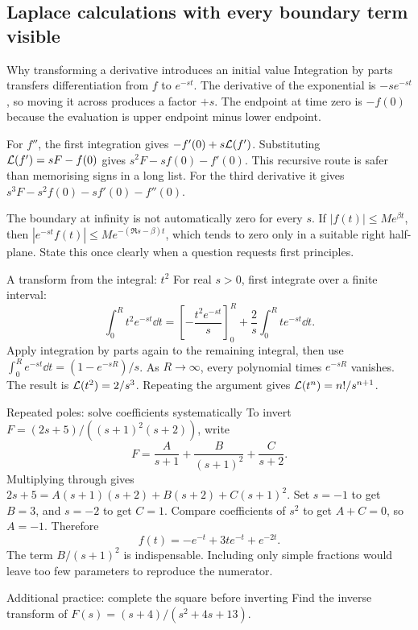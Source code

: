 \subsection{Laplace calculations with every boundary term visible}
\begin{concept}{Why transforming a derivative introduces an initial value}
Integration by parts transfers differentiation from $f$ to $e^{-st}$. The derivative of the exponential is $-se^{-st}$, so moving it across produces a factor $+s$. The endpoint at time zero is $-f(0)$ because the evaluation is upper endpoint minus lower endpoint.

For $f''$, the first integration gives $-f'(0)+s\mathcal L(f')$. Substituting $\mathcal L(f')=sF-f(0)$ gives $s^2F-sf(0)-f'(0)$. This recursive route is safer than memorising signs in a long list. For the third derivative it gives $s^3F-s^2f(0)-sf'(0)-f''(0)$.

The boundary at infinity is not automatically zero for every $s$. If $|f(t)|\leq Me^{\beta t}$, then $|e^{-st}f(t)|\leq Me^{-(\Re s-\beta)t}$, which tends to zero only in a suitable right half-plane. State this once clearly when a question requests first principles.
\end{concept}
\begin{worked}{A transform from the integral: $t^2$}
For real $s>0$, first integrate over a finite interval:
\[\int_0^R t^2e^{-st}\dd t=\left[-\frac{t^2e^{-st}}s\right]_0^R+\frac2s\int_0^R te^{-st}\dd t.\]
Apply integration by parts again to the remaining integral, then use $\int_0^R e^{-st}\dd t=(1-e^{-sR})/s$. As $R\to\infty$, every polynomial times $e^{-sR}$ vanishes. The result is $\mathcal L(t^2)=2/s^3$. Repeating the argument gives $\mathcal L(t^n)=n!/s^{n+1}$.
\end{worked}
\begin{method}{Repeated poles: solve coefficients systematically}
To invert $F=(2s+5)/((s+1)^2(s+2))$, write
\[F=\frac A{s+1}+\frac B{(s+1)^2}+\frac C{s+2}.\]
Multiplying through gives $2s+5=A(s+1)(s+2)+B(s+2)+C(s+1)^2$. Set $s=-1$ to get $B=3$, and $s=-2$ to get $C=1$. Compare coefficients of $s^2$ to get $A+C=0$, so $A=-1$. Therefore
\[f(t)=-e^{-t}+3te^{-t}+e^{-2t}.\]
The term $B/(s+1)^2$ is indispensable. Including only simple fractions would leave too few parameters to reproduce the numerator.
\end{method}
\begin{question}{Additional practice: complete the square before inverting}
Find the inverse transform of $F(s)=(s+4)/(s^2+4s+13)$.
\end{question}
